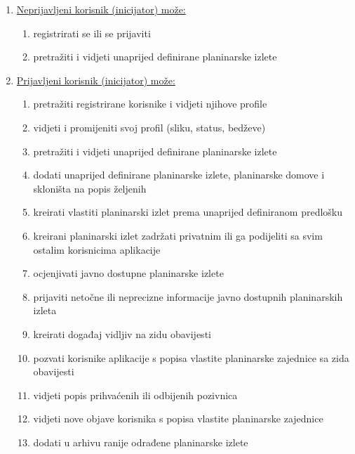 \begin{enumerate}
\item \underline{Neprijavljeni korisnik (inicijator) može:}
\begin{enumerate}
\item registrirati se ili se prijaviti
\item pretražiti i vidjeti unaprijed definirane planinarske izlete
\end{enumerate}

\item \underline{Prijavljeni korisnik (inicijator) može:}
\begin{enumerate}
\item pretražiti registrirane korisnike i vidjeti njihove profile
\item vidjeti i promijeniti svoj profil (sliku, status, bedževe)
\item pretražiti i vidjeti unaprijed definirane planinarske izlete
\item dodati unaprijed definirane planinarske izlete, planinarske domove i skloništa na popis željenih
\item kreirati vlastiti planinarski izlet prema unaprijed definiranom predlošku
\item kreirani planinarski izlet zadržati privatnim ili ga podijeliti sa svim ostalim korisnicima aplikacije
\item ocjenjivati javno dostupne planinarske izlete
\item prijaviti netočne ili neprecizne informacije javno dostupnih planinarskih izleta
\item kreirati događaj vidljiv na zidu obavijesti
\item pozvati korisnike aplikacije s popisa vlastite planinarske zajednice sa zida obavijesti
\item vidjeti popis prihvaćenih ili odbijenih pozivnica
\item vidjeti nove objave korisnika s popisa vlastite planinarske zajednice
\item dodati u arhivu ranije odrađene planinarske izlete
\end{enumerate}


\end{enumerate}

